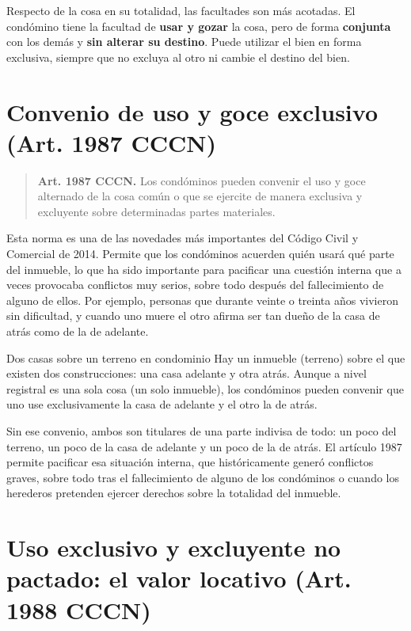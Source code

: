 \documentclass[12pt,oneside]{book}
\begin{document}
Respecto de la cosa en su totalidad, las facultades son más acotadas. El condómino tiene la facultad de \textbf{usar y gozar} la cosa, pero de forma \textbf{conjunta} con los demás y \textbf{sin alterar su destino}. Puede utilizar el bien en forma exclusiva, siempre que no excluya al otro ni cambie el destino del bien.

\section{Convenio de uso y goce exclusivo (Art. 1987 CCCN)}

\begin{quote}
\textbf{Art. 1987 CCCN.} Los condóminos pueden convenir el uso y goce alternado de la cosa común o que se ejercite de manera exclusiva y excluyente sobre determinadas partes materiales.
\end{quote}

Esta norma es una de las novedades más importantes del Código Civil y Comercial de 2014. Permite que los condóminos acuerden quién usará qué parte del inmueble, lo que ha sido importante para pacificar una cuestión interna que a veces provocaba conflictos muy serios, sobre todo después del fallecimiento de alguno de ellos. Por ejemplo, personas que durante veinte o treinta años vivieron sin dificultad, y cuando uno muere el otro afirma ser tan dueño de la casa de atrás como de la de adelante.

\begin{example}{Dos casas sobre un terreno en condominio}
Hay un inmueble (terreno) sobre el que existen dos construcciones: una casa adelante y otra atrás. Aunque a nivel registral es una sola cosa (un solo inmueble), los condóminos pueden convenir que uno use exclusivamente la casa de adelante y el otro la de atrás.

Sin ese convenio, ambos son titulares de una parte indivisa de todo: un poco del terreno, un poco de la casa de adelante y un poco de la de atrás. El artículo 1987 permite pacificar esa situación interna, que históricamente generó conflictos graves, sobre todo tras el fallecimiento de alguno de los condóminos o cuando los herederos pretenden ejercer derechos sobre la totalidad del inmueble.
\end{example}

\section{Uso exclusivo y excluyente no pactado: el valor locativo (Art. 1988 CCCN)}
\end{document}
